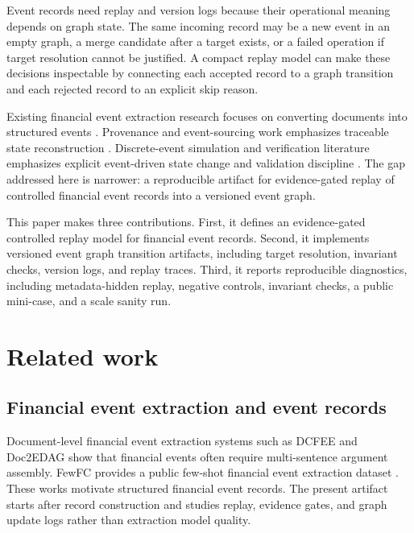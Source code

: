 \documentclass[3p,times,procedia]{elsarticle}
\begin{document}
Event records need replay and version logs because their operational meaning depends on graph state. The same incoming record may be a new event in an empty graph, a merge candidate after a target exists, or a failed operation if target resolution cannot be justified. A compact replay model can make these decisions inspectable by connecting each accepted record to a graph transition and each rejected record to an explicit skip reason.

Existing financial event extraction research focuses on converting documents into structured events \cite{yang2018dcfee,zheng2019doc2edag,ma2022fewfc}. Provenance and event-sourcing work emphasizes traceable state reconstruction \cite{w3c2013provo,fowler2005eventsourcing}. Discrete-event simulation and verification literature emphasizes explicit event-driven state change and validation discipline \cite{banks2010discrete,law2015simulation,sargent2013verification}. The gap addressed here is narrower: a reproducible artifact for evidence-gated replay of controlled financial event records into a versioned event graph.

This paper makes three contributions. First, it defines an evidence-gated controlled replay model for financial event records. Second, it implements versioned event graph transition artifacts, including target resolution, invariant checks, version logs, and replay traces. Third, it reports reproducible diagnostics, including metadata-hidden replay, negative controls, invariant checks, a public mini-case, and a scale sanity run.

\section{Related work}

\subsection{Financial event extraction and event records}

Document-level financial event extraction systems such as DCFEE \cite{yang2018dcfee} and Doc2EDAG \cite{zheng2019doc2edag} show that financial events often require multi-sentence argument assembly. FewFC provides a public few-shot financial event extraction dataset \cite{ma2022fewfc}. These works motivate structured financial event records. The present artifact starts after record construction and studies replay, evidence gates, and graph update logs rather than extraction model quality.
\end{document}
